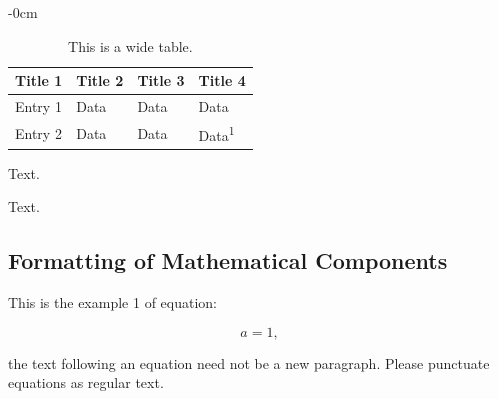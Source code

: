 \documentclass[vision,article,submit,pdftex,moreauthors]{Definitions/mdpi}
\begin{document}
\begin{table}[H]
\caption{This is a wide table.\label{tab2}}
	\begin{adjustwidth}{-\extralength}{0cm}
		\begin{tabularx}{\fulllength}{CCCC}
			\toprule
			\textbf{Title 1}	& \textbf{Title 2}	& \textbf{Title 3}     & \textbf{Title 4}\\
			\midrule
			Entry 1		& Data			& Data			& Data\\
			Entry 2		& Data			& Data			& Data\textsuperscript{1}\\
			\bottomrule
		\end{tabularx}
	\end{adjustwidth}
\end{table}


Text.

Text.

\subsection{Formatting of Mathematical Components}

This is the example 1 of equation:
\begin{linenomath}
\begin{equation}
a = 1,
\end{equation}
\end{linenomath}
the text following an equation need not be a new paragraph. Please punctuate equations as regular text.
\end{document}
